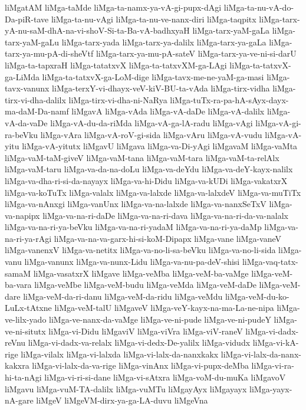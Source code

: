 {liMgatAM
liMga-taMde
liMga-ta-namx-ya-vA-gi-pupx-dAgi
liMga-ta-nu-vA-do-Da-piR-tave
liMga-ta-nu-vAgi
liMga-ta-nu-ve-nanx-diri
liMga-taqpitx
liMga-tarx-yA-nu-saM-dhA-na-vi-shoV-Si-ta-Ba-vA-badhxyaH
liMga-tarx-yaM-gaLa
liMga-tarx-yaM-gaLu
liMga-tarx-yada
liMga-tarx-ya-dalilx
liMga-tarx-ya-gaLa
liMga-tarx-ya-mu-pA-di-sheVtf
liMga-tarx-ya-mu-pA-sateV
liMga-tarx-ya-ve-ni-si-darU
liMga-ta-tapxraH
liMga-tatatxvX
liMga-ta-tatxvXM-ga-LAgi
liMga-ta-tatxvX-ga-LiMda
liMga-ta-tatxvX-ga-LoM-dige
liMga-tavx-me-ne-yaM-ga-masi
liMga-tavx-vanunx
liMga-terxY-vi-dhayx-veV-kiV-BU-ta-vAda
liMga-tirx-vidha
liMga-tirx-vi-dha-dalilx
liMga-tirx-vi-dha-ni-NaRya
liMga-tuTx-ra-pa-hA-sAyx-dayx-ma-daM-Da-namf
liMgavA
liMga-vAda
liMga-vA-daDe
liMga-vA-dalilx
liMga-vA-da-vaDe
liMga-vA-du-da-riMda
liMga-vA-ga-lA-radu
liMga-vAgi
liMga-vA-gi-ra-beVku
liMga-vAra
liMga-vA-roV-gi-sida
liMga-vAru
liMga-vA-vudu
liMga-vA-yitu
liMga-vA-yitutx
liMgavU
liMgava
liMga-va-Di-yAgi
liMgavaM
liMga-vaMta
liMga-vaM-taM-giveV
liMga-vaM-tana
liMga-vaM-tara
liMga-vaM-ta-relAlx
liMga-vaM-taru
liMga-va-da-na-doLu
liMga-va-deYdu
liMga-va-deY-kayx-nalilx
liMga-va-dha-ri-si-da-nayayx
liMga-va-hi-Didu
liMga-va-kUDi
liMga-vakatxrX
liMga-va-koTuTx
liMga-valalx
liMga-va-lalxde
liMga-va-lalxdeV
liMga-va-muTiTx
liMga-va-nAnxgi
liMga-vanUnx
liMga-va-na-lalxde
liMga-va-nanxSeTxV
liMga-va-napipx
liMga-va-na-ri-daDe
liMga-va-na-ri-dava
liMga-va-na-ri-da-va-nalalx
liMga-va-na-ri-ya-beVku
liMga-va-na-ri-yadaM
liMga-va-na-ri-ya-daMp
liMga-va-na-ri-ya-rAgi
liMga-va-na-va-garx-hi-si-koM-Dipapx
liMga-vane
liMga-vaneV
liMga-vanenxV
liMga-va-netitx
liMga-va-no-li-sa-beVku
liMga-va-no-li-sida
liMga-vanu
liMga-vanunx
liMga-va-nunx-Lidu
liMga-va-nu-pa-deV-shisi
liMga-vaq-tatx-samaM
liMga-vasatxrX
liMgave
liMga-veMba
liMga-veM-ba-vaMge
liMga-veM-ba-vara
liMga-veMbe
liMga-veM-budu
liMga-veMda
liMga-veM-daDe
liMga-veM-dare
liMga-veM-da-ri-danu
liMga-veM-da-ridu
liMga-veMdu
liMga-veM-du-ko-LuLx-tAtxne
liMga-veM-talU
liMgaveV
liMga-veY-kayx-na-ma-La-ne-nipa
liMga-ve-lilx-yado
liMga-ve-nanx-da-vaMge
liMga-ve-ni-pude
liMga-ve-ni-pudeY
liMga-ve-ni-situtx
liMga-vi-Didu
liMgaviV
liMga-viVra
liMga-viV-raneV
liMga-vi-dadx-reVnu
liMga-vi-dadx-va-relalx
liMga-vi-dedx-De-yalilx
liMga-vidudx
liMga-vi-kA-rige
liMga-vilalx
liMga-vi-lalxda
liMga-vi-lalx-da-nanxkakx
liMga-vi-lalx-da-nanx-kakxra
liMga-vi-lalx-da-va-rige
liMga-vinAnx
liMga-vi-pupx-deMba
liMga-vi-ra-hi-ta-nAgi
liMga-vi-ri-si-dane
liMga-vi-sAtxra
liMga-voM-du-muKa
liMgavoV
liMgavu
liMga-vuM-TA-dalilx
liMga-vuMTu
liMgayAyx
liMgayayx
liMga-yayx-nA-gare
liMgeV
liMgeVM-dirx-ya-ga-LA-duvu
liMgeVna
}
